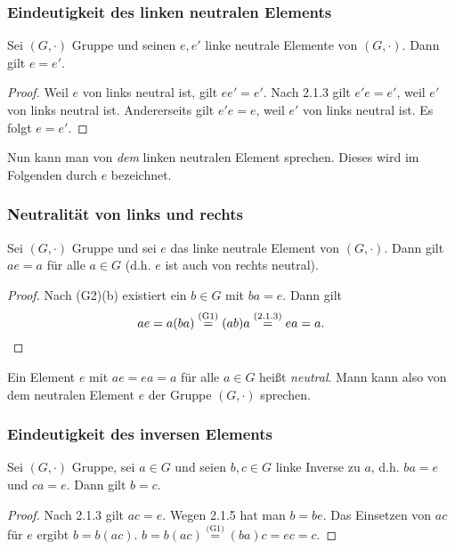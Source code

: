 \subsubsection{Eindeutigkeit des linken neutralen Elements}

\begin{propn}
	Sei $ (G,\cdot) $ Gruppe und seinen $ e,e' $ linke neutrale Elemente von $ (G,\cdot) $. Dann gilt $ e = e' $.
\end{propn}
\begin{proof}
	Weil $ e $ von links neutral ist, gilt $ ee' = e' $. Nach 2.1.3 gilt $ e'e = e' $, weil $ e' $ von links neutral ist. Andererseits gilt $ e'e = e $, weil $ e' $ von links neutral ist. Es folgt $ e = e' $.
\end{proof}

\noindent Nun kann man von \emph{dem} linken neutralen Element sprechen. Dieses wird im Folgenden durch $ e $ bezeichnet.

\subsubsection{Neutralität von links und rechts}

\begin{propn}
	Sei $ (G,\cdot) $ Gruppe und sei $ e $ das linke neutrale Element von $ (G,\cdot) $. Dann gilt $ ae = a $ für alle $ a \in G $ (d.h. $ e $ ist auch von rechts neutral).
\end{propn}
\begin{proof}
	Nach (G2)(b) existiert ein $ b \in G $ mit $ ba = e $. Dann gilt
	\begin{equation*}
		ae = a(ba) \stackrel{(\text{G1})}{=} (ab)a \stackrel{(2.1.3)}{=} ea = a. \qedhere
	\end{equation*}
\end{proof}

\noindent Ein Element $ e $ mit $ ae = ea = a $ für alle $ a \in G $ heißt \emph{neutral}. Mann kann also von dem neutralen Element $ e $ der Gruppe $ (G,\cdot) $ sprechen.

\subsubsection{Eindeutigkeit des inversen Elements}

\begin{propn}
	Sei $ (G,\cdot) $ Gruppe, sei $ a \in G $ und seien $ b,c \in G $ linke Inverse zu $ a $, d.h. $ ba = e $ und $ ca = e $. Dann gilt $ b = c $.
\end{propn}
\begin{proof}
	Nach 2.1.3 gilt $ ac = e $. Wegen 2.1.5 hat man $ b = be $. Das Einsetzen von $ ac $ für $ e $ ergibt $ b = b(ac) $. $ b = b(ac) \overset{\text{(G1)}}{=} (ba)c = ec = c $.
\end{proof}

